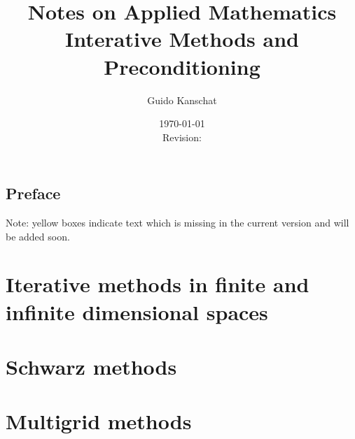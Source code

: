 \documentclass[USenglish,limits]{report}
\title{\textbf{Notes on Applied Mathematics}
\\[5mm]
{\large Interative Methods and Preconditioning}}
\author{Guido Kanschat}
\date{\today\\[5mm]Revision: \svnrev}
\begin{document}
\maketitle

\section*{Preface}


\begin{todo}
  Note: yellow boxes indicate text which is missing in the current
  version and will be added soon.
\end{todo}

\tableofcontents

\chapter{Iterative methods in finite and infinite dimensional spaces}



\chapter{Schwarz methods}


\chapter{Multigrid methods}


\printbibliography
\printindex
\end{document}
